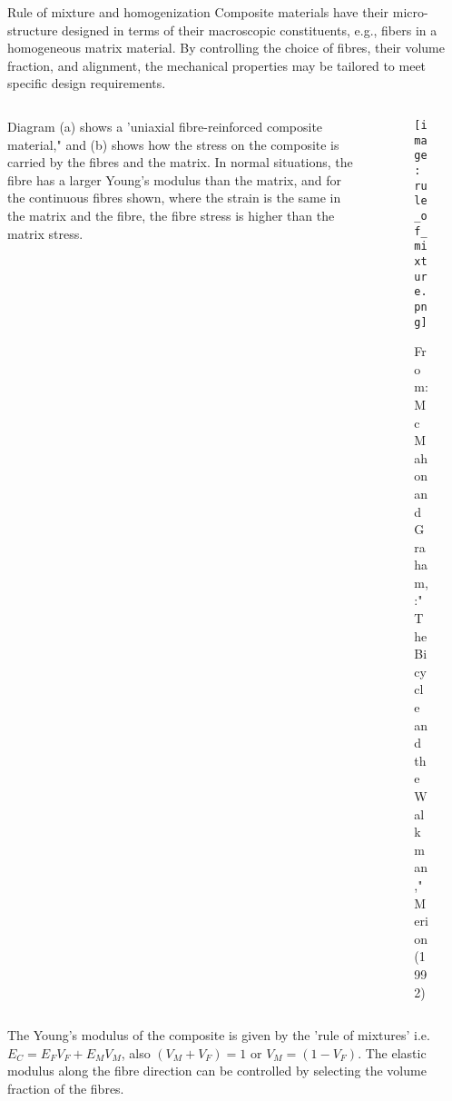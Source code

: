 \documentclass[10pt,aspectratio=169,dvipsnames]{beamer} %
\begin{document}
	\begin{frame}{Rule of mixture and homogenization}	
		\footnotesize		
		\noindent Composite materials have their micro-structure designed in terms of their macroscopic constituents, e.g., fibers in a homogeneous matrix material. 
		By controlling the choice of fibres, their volume fraction, and alignment, the mechanical properties may be tailored to meet specific design requirements.
		\begin{columns}[T]				
			\begin{column}{0.45\textwidth}
				Diagram (a) shows a 'uniaxial fibre-reinforced composite material," and (b) shows how the stress on the composite is carried by the fibres and the matrix. 
				In normal situations, the fibre has a larger Young's modulus than the matrix, and for the continuous fibres shown, where the strain is the same in the matrix and the fibre, the fibre stress is higher than the matrix stress.
			\end{column}
			\begin{column}{0.45\textwidth}
				\begin{figure}
					\texttt{[image: rule\_of\_mixture.png]}
					\caption{From: McMahon and Graham, :"The Bicycle and the Walkman," Merion (1992)}
				\end{figure}
			\end{column}
		\end{columns}
		The Young's modulus of the composite is given by the 'rule of mixtures' i.e. \(E_C = E_F V_F + E_MV_M\), also \((V_M + V_F) = 1\) or \(V_M = (1 - V_F )\). 
		The elastic modulus along the fibre direction can be controlled by selecting the volume fraction of the fibres.		
	\end{frame}
\end{document}
